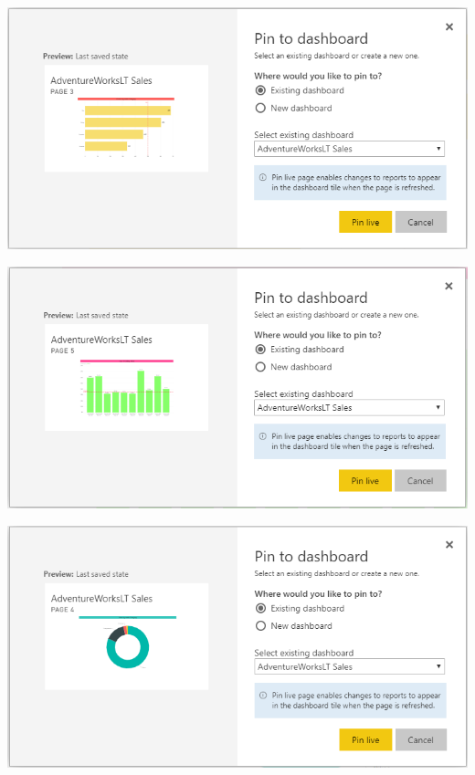 	\begin{center}
	\includegraphics[width=15cm]{./images/power33}
	\end{center}	

	\begin{center}
	\includegraphics[width=15cm]{./images/power34}
	\end{center}	

	\begin{center}
	\includegraphics[width=15cm]{./images/power35}
	\end{center}	
